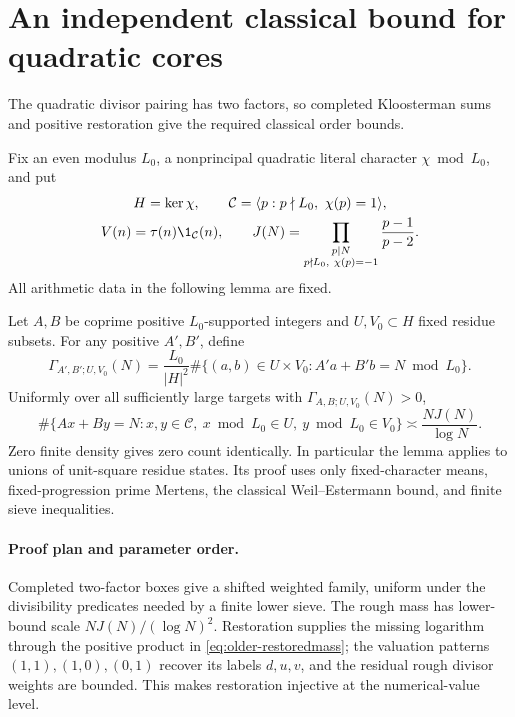 \section{An independent classical bound for quadratic cores}\label{sec:older-route}

The quadratic divisor pairing has two factors, so completed
Kloosterman sums and positive restoration give the required classical
order bounds.

Fix an even modulus \(L_0\), a nonprincipal quadratic literal character
\(\chi\bmod L_0\), and put
\[
 \begin{gathered}
 H=\ker\chi,\qquad
 \mathcal C=\langle p:p\nmid L_0,\ \chi(p)=1\rangle,\\
 V(n)=\tau(n)\1_{\mathcal C}(n),\qquad
 J(N)=\prod_{\substack{p\mid N\\p\nmid L_0,\ \chi(p)=-1}}
                          \frac{p-1}{p-2}.
 \end{gathered}
\]
All arithmetic data in the following lemma are fixed.

\begin{lemma}\label{lem:older-quadratic-filter}
Let \(A,B\) be coprime positive \(L_0\)-supported integers and
\(U,V_0\subset H\) fixed residue subsets. For any positive \(A',B'\), define
\[
 \Gamma_{A',B';U,V_0}(N)=\frac{L_0}{|H|^2}
   \#\{(a,b)\in U\times V_0:A'a+B'b=N\bmod L_0\}.
\]
Uniformly over all sufficiently large targets with \(\Gamma_{A,B;U,V_0}(N)>0\),
\[
 \#\{Ax+By=N:x,y\in\mathcal C,\
                  x\bmod L_0\in U,\ y\bmod L_0\in V_0\}
                   \asymp\frac{NJ(N)}{\log N}.
\]
Zero finite density gives zero count identically.  In particular the
lemma applies to unions of unit-square residue states.
Its proof uses only fixed-character means, fixed-progression prime
Mertens, the classical Weil--Estermann bound, and finite sieve inequalities.
\end{lemma}

\paragraph{Proof plan and parameter order.}
Completed two-factor boxes give a shifted weighted family, uniform
under the divisibility predicates needed by a finite lower sieve.
The rough mass has lower-bound scale \(NJ(N)/(\log N)^2\).
Restoration supplies the missing logarithm through the positive
product in \eqref{eq:older-restoredmass}; the valuation patterns
\((1,1),(1,0),(0,1)\) recover its labels \(d,u,v\), and the residual
rough divisor weights are bounded. This makes restoration injective
at the numerical-value level.

